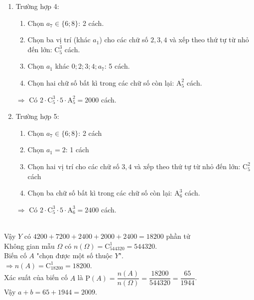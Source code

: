 \begin{ex}
{\begin{enumerate}[$\bullet$]
\begin{enumerate}[$\circ$]
				\item Chọn ba chữ số bất kì trong các chữ số còn lại: $\mathrm{A}_3^6$ cách
			\end{enumerate}
			$\Rightarrow$ Có $1\cdot\mathrm{C}_6^3\cdot \mathrm{A}_6^3=2400 $ cách.
			\item Trường hợp 4:
			\begin{enumerate}[$\circ$]
				\item Chọn $a_7\in\{6;8\}$: 2 cách.
				\item Chọn ba vị trí (khác $a_1$) cho các chữ số $2,3,4$ và xếp theo thứ tự từ nhỏ đến lớn: $\mathrm{C}_5^3$ cách.
				\item Chọn $a_1$ khác $0;2;3;4;a_7$: 5 cách.
				\item Chọn hai chữ số bất kì trong các chữ số còn lại: $\mathrm{A}_5^2$ cách.
			\end{enumerate}
			$\Rightarrow$ Có $2\cdot\mathrm{C}_5^3\cdot 5\cdot \mathrm{A}_5^2=2000 $ cách.
			\item Trường hợp 5:
			\begin{enumerate}[$\circ$]
				\item Chọn $a_7\in\{6;8\}$: 2 cách
				\item Chọn $a_1=2$: 1 cách
				\item Chọn hai vị trí cho các chữ số $3,4$ và xếp theo thứ tự từ nhỏ đến lớn: $\mathrm{C}_5^2$ cách
				\item Chọn ba chữ số bất kì trong các chữ số còn lại: $\mathrm{A}_6^3$ cách.
			\end{enumerate}
			$\Rightarrow$ Có $2\cdot\mathrm{C}_5^3\cdot 5\cdot \mathrm{A}_6^3=2400 $ cách.
		\end{enumerate}\
		\\
		Vậy $Y$ có $4200+7200+2400+2000+2400=18200$ phần tử
		\\
		Không gian mẫu $\Omega$ có $n(\Omega)=\mathrm{C}_{544320}^1=544320$.
		\\
		Biến cố $A$ "chọn được một số thuộc $Y$".
		\\
		$\Rightarrow n(A)=\mathrm{C}_{18200}^1=18200$.
		\\
		Xác suất của biến cố $A$ là $\mathrm{P}(A)=\dfrac{n(A)}{n(\Omega)}=\dfrac{18200}{544320}=\dfrac{65}{1944}$.
		\\
		Vậy $a+b=65+1944=2009$.
	}
\end{ex}

